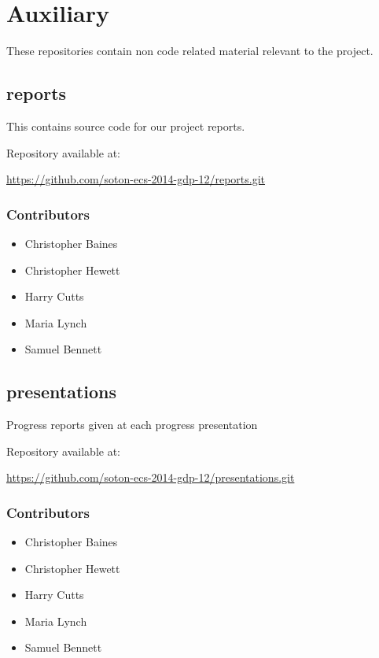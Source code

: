 \section{Auxiliary}

These repositories contain non code related material relevant to the project.

\subsection{reports}
\label{Section:Repo_reports}

This contains source code for our project reports.

Repository available at:

\url{https://github.com/soton-ecs-2014-gdp-12/reports.git}

\subsubsection{Contributors}
\begin{itemize}
  \item Christopher Baines
  \item Christopher Hewett
  \item Harry Cutts
  \item Maria Lynch
  \item Samuel Bennett
\end{itemize}

\subsection{presentations}
\label{Section:Repo_presentations}

Progress reports given at each progress presentation

Repository available at:

\url{https://github.com/soton-ecs-2014-gdp-12/presentations.git}

\subsubsection{Contributors}
\begin{itemize}
  \item Christopher Baines
  \item Christopher Hewett
  \item Harry Cutts
  \item Maria Lynch
  \item Samuel Bennett
\end{itemize}

